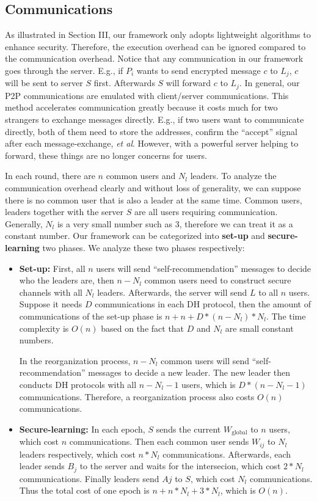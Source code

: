 \subsection{Communications}
As illustrated in Section III, our framework only adopts lightweight algorithms to enhance security. Therefore, the execution overhead can be ignored compared to the communication overhead. Notice that any communication in our framework goes through the server. E.g., if $P_i$ wants to send encrypted message $c$ to $L_j$, $c$ will be sent to server $S$ first. Afterwards $S$ will forward $c$ to $L_j$. In general, our P2P communications are emulated with client/server communications. This method accelerates communication greatly because it costs much for two strangers to exchange messages directly. E.g., if two users want to communicate directly, both of them need to store the addresses, confirm the ``accept'' signal after each message-exchange, \emph{et al}. However, with a powerful server helping to forward, these things are no longer concerns for users.

In each round, there are $n$ common users and $N_l$ leaders. To analyze the communication overhead clearly and without loss of generality, we can suppose there is no common user that is also a leader at the same time. Common users, leaders together with the server $S$ are all users requiring communication. Generally, $N_l$ is a very small number such as 3, therefore we can treat it as a constant number. Our framework can be categorized into \textbf{set-up} and \textbf{secure-learning} two phases. We analyze these two phases respectively:

\begin{itemize}
    \item \textbf{Set-up:} First, all $n$ users will send ``self-recommendation'' messages to decide who the leaders are, then $n - N_l$ common users need to construct secure channels with all $N_l$ leaders. Afterwards, the server will send $L$ to all $n$ users. Suppose it needs $D$ communications in each DH protocol, then the amount of communications of the set-up phase is $n + n + D * (n - N_l) * N_l$. The time complexity is $O(n)$ based on the fact that $D$ and $N_l$ are small constant numbers.
    
    In the reorganization process, $n - N_l$ common users will send ``self-recommendation'' messages to decide a new leader. The new leader then conducts DH protocols with all $n - N_l - 1$ users, which is $D * (n - N_l - 1)$ communications. Therefore, a reorganization process also costs $O(n)$ communications.
    
    \item \textbf{Secure-learning:} In each epoch, $S$ sends the current $W_\textrm{global}$ to $n$ users, which cost $n$ communications. Then each common user sends $W_{ij}$ to $N_l$ leaders respectively, which cost $n * N_l$ communications. Afterwards, each leader sends $B_j$ to the server and waits for the intersecion, which cost $2 * N_l$ communications. Finally leaders send $Aj$ to $S$, which cost $N_l$ communications. Thus the total cost of one epoch is $n + n * N_l + 3 * N_l$, which is $O(n)$.
\end{itemize}


